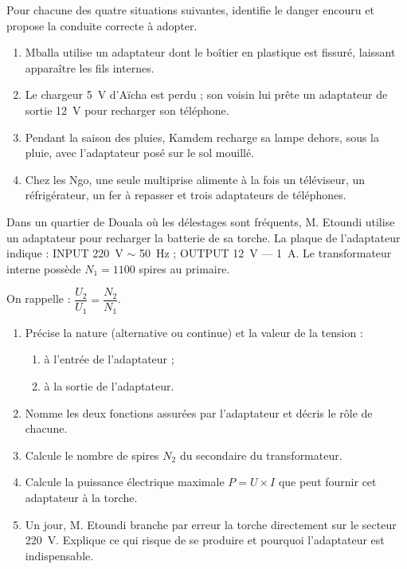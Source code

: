 \documentclass[11pt]{article}
\newcounter{popsec}
\newcounter{popsub}
\newcommand{\courssub}[1]{%
  \stepcounter{popsub}%
  \par\vspace{9pt}\noindent{\popxbold\fontsize{11.5}{13}\selectfont\color{popink}{\color{poporange}\thepopsec.\thepopsub}\hspace{6pt}#1}\par\nopagebreak\vspace{4pt}
}
\begin{document}
\begin{exercice}
Pour chacune des quatre situations suivantes, identifie le danger encouru et propose la conduite correcte à adopter.

\begin{enumerate}
\item Mballa utilise un adaptateur dont le boîtier en plastique est fissuré, laissant apparaître les fils internes.
\item Le chargeur \SI{5}{V} d'Aïcha est perdu ; son voisin lui prête un adaptateur de sortie \SI{12}{V} pour recharger son téléphone.
\item Pendant la saison des pluies, Kamdem recharge sa lampe dehors, sous la pluie, avec l'adaptateur posé sur le sol mouillé.
\item Chez les Ngo, une seule multiprise alimente à la fois un téléviseur, un réfrigérateur, un fer à repasser et trois adaptateurs de téléphones.
\end{enumerate}
\end{exercice}

\courssub{Je me prépare au Bac}

\begin{exercice}
Dans un quartier de Douala où les délestages sont fréquents, M. Etoundi utilise un adaptateur pour recharger la batterie de sa torche. La plaque de l'adaptateur indique : INPUT \SI{220}{V} $\sim$ \SI{50}{Hz} ; OUTPUT \SI{12}{V} $\text{---}$ \SI{1}{A}. Le transformateur interne possède $N_1 = 1100$ spires au primaire.

On rappelle : $\dfrac{U_2}{U_1} = \dfrac{N_2}{N_1}$.

\begin{enumerate}
\item Précise la nature (alternative ou continue) et la valeur de la tension :
\begin{enumerate}
\item à l'entrée de l'adaptateur ;
\item à la sortie de l'adaptateur.
\end{enumerate}
\item Nomme les deux fonctions assurées par l'adaptateur et décris le rôle de chacune.
\item Calcule le nombre de spires $N_2$ du secondaire du transformateur.
\item Calcule la puissance électrique maximale $P = U \times I$ que peut fournir cet adaptateur à la torche.
\item Un jour, M. Etoundi branche par erreur la torche directement sur le secteur \SI{220}{V}. Explique ce qui risque de se produire et pourquoi l'adaptateur est indispensable.
\end{enumerate}
\end{exercice}
\end{document}
